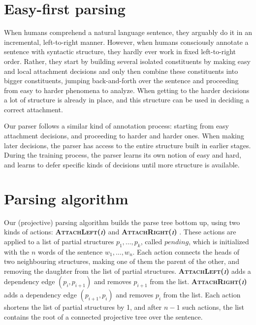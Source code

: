 \documentclass[11pt]{article}
\newcommand{\act}[1]{ {\textbf{\textsc{#1}}} }
\begin{document}


\vspace{-1em}
\section{Easy-first parsing}
\vspace{-1em}
When humans comprehend a natural language sentence, they arguably do it in an incremental, left-to-right manner.  However, when humans consciously annotate a sentence with syntactic structure, they hardly ever work in fixed left-to-right order.  Rather, they start by building several isolated constituents by making easy and local attachment decisions and only then combine these constituents into bigger constituents, jumping back-and-forth over the sentence and proceeding from easy to harder phenomena to analyze.  When getting to the harder decisions a lot of structure is already in place, and this structure can be used in deciding a correct attachment.

Our parser follows a similar kind of annotation process: starting from easy attachment decisions, and proceeding to harder and harder ones.  When making later decisions, the parser has access to the entire structure built in earlier stages.  During the training process, the parser learns its own notion of easy and hard, and learns to defer specific kinds of decisions until more structure is available.  


\section{Parsing algorithm}

Our (projective) parsing algorithm builds the parse tree bottom up, using two kinds of actions: \act{AttachLeft(\textit{i})} and \act{AttachRight(\textit{i})}.  These actions are applied to a list of partial structures $p_1,\ldots,p_k$, called $pending$, which is initialized with the $n$ words of the sentence $w_1,\ldots,w_n$.   Each action connects the heads of two neighbouring structures, making one of them the parent of the other, and removing the daughter from the list of partial structures.  \act{AttachLeft(\textit{i})} adds a dependency edge $(p_i,p_{i+1})$ and removes $p_{i+1}$ from the list.  \act{AttachRight(\textit{i})} adds a dependency edge $(p_{i+1},p_i)$ and removes $p_i$ from the list.  Each action shortens the list of partial structures by 1, and after $n-1$ such actions, the list contains the root of a connected projective tree over the sentence.
\end{document}

